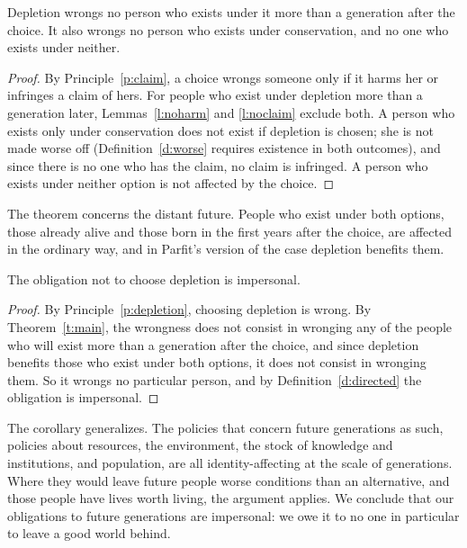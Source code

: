 \documentclass{situationist-preprint}
\begin{document}
\begin{theorem}\label{t:main}
Depletion wrongs no person who exists under it more than a generation after the choice. It also wrongs no person who exists under conservation, and no one who exists under neither.
\end{theorem}

\begin{proof}
By Principle~\ref{p:claim}, a choice wrongs someone only if it harms her or infringes a claim of hers. For people who exist under depletion more than a generation later, Lemmas~\ref{l:noharm} and \ref{l:noclaim} exclude both. A person who exists only under conservation does not exist if depletion is chosen; she is not made worse off (Definition~\ref{d:worse} requires existence in both outcomes), and since there is no one who has the claim, no claim is infringed. A person who exists under neither option is not affected by the choice.
\end{proof}

The theorem concerns the distant future. People who exist under both options, those already alive and those born in the first years after the choice, are affected in the ordinary way, and in Parfit's version of the case depletion benefits them.

\begin{corollary}\label{c:impersonal}
The obligation not to choose depletion is impersonal.
\end{corollary}

\begin{proof}
By Principle~\ref{p:depletion}, choosing depletion is wrong. By Theorem~\ref{t:main}, the wrongness does not consist in wronging any of the people who will exist more than a generation after the choice, and since depletion benefits those who exist under both options, it does not consist in wronging them. So it wrongs no particular person, and by Definition~\ref{d:directed} the obligation is impersonal.
\end{proof}

The corollary generalizes. The policies that concern future generations as such, policies about resources, the environment, the stock of knowledge and institutions, and population, are all identity-affecting at the scale of generations. Where they would leave future people worse conditions than an alternative, and those people have lives worth living, the argument applies. We conclude that our obligations to future generations are impersonal: we owe it to no one in particular to leave a good world behind.
\end{document}
